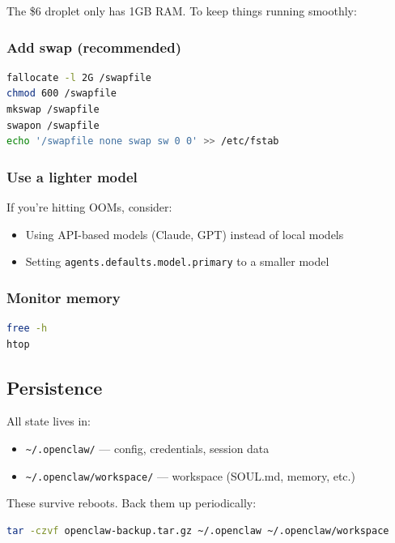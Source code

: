 The \$6 droplet only has 1GB RAM. To keep things running smoothly:

\subsubsection{Add swap (recommended)}


\begin{lstlisting}[language=bash]
fallocate -l 2G /swapfile
chmod 600 /swapfile
mkswap /swapfile
swapon /swapfile
echo '/swapfile none swap sw 0 0' >> /etc/fstab
\end{lstlisting}


\subsubsection{Use a lighter model}


If you're hitting OOMs, consider:

\begin{itemize}
  \item Using API-based models (Claude, GPT) instead of local models
  \item Setting \texttt{agents.defaults.model.primary} to a smaller model
\end{itemize}


\subsubsection{Monitor memory}


\begin{lstlisting}[language=bash]
free -h
htop
\end{lstlisting}


\hrulefill


\subsection{Persistence}


All state lives in:

\begin{itemize}
  \item \texttt{\textasciitilde{}/.openclaw/} — config, credentials, session data
  \item \texttt{\textasciitilde{}/.openclaw/workspace/} — workspace (SOUL.md, memory, etc.)
\end{itemize}


These survive reboots. Back them up periodically:

\begin{lstlisting}[language=bash]
tar -czvf openclaw-backup.tar.gz ~/.openclaw ~/.openclaw/workspace
\end{lstlisting}


